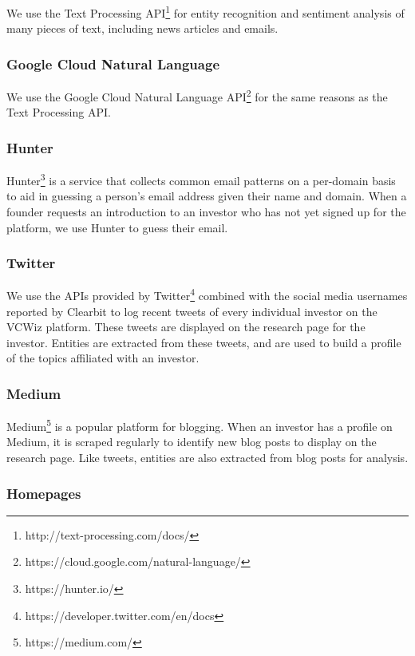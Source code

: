 We use the Text Processing API\footnote{http://text-processing.com/docs/} for entity recognition and sentiment analysis of many pieces of text, including news articles and emails.

\subsubsection{Google Cloud Natural Language}

We use the Google Cloud Natural Language API\footnote{https://cloud.google.com/natural-language/} for the same reasons as the Text Processing API.

\subsubsection{Hunter}

Hunter\footnote{https://hunter.io/} is a service that collects common email patterns on a per-domain basis to aid in guessing a person's email address given their name and domain. When a founder requests an introduction to an investor who has not yet signed up for the platform, we use Hunter to guess their email.

\subsubsection{Twitter}

We use the APIs provided by Twitter\footnote{https://developer.twitter.com/en/docs} combined with the social media usernames reported by Clearbit to log recent tweets of every individual investor on the VCWiz platform. These tweets are displayed on the research page for the investor. Entities are extracted from these tweets, and are used to build a profile of the topics affiliated with an investor.

\subsubsection{Medium}

Medium\footnote{https://medium.com/} is a popular platform for blogging. When an investor has a profile on Medium, it is scraped regularly to identify new blog posts to display on the research page. Like tweets, entities are also extracted from blog posts for analysis.

\subsubsection{Homepages}

